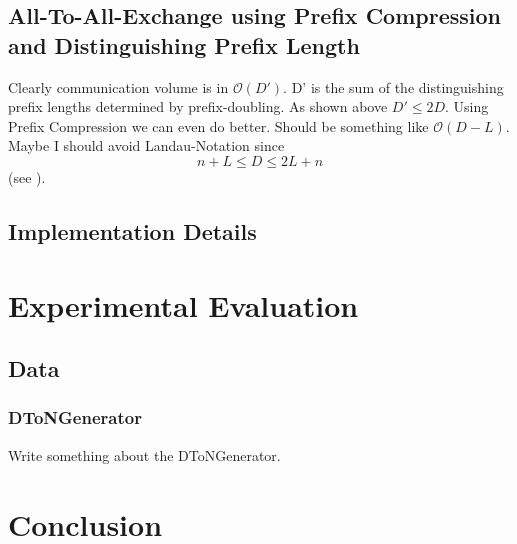\documentclass[12pt,a4paper,twoside]{scrartcl}
\numberwithin{equation}{section}
\begin{document}
\subsection{All-To-All-Exchange using Prefix Compression and Distinguishing Prefix Length}

Clearly communication volume is in $\mathcal{O}(D')$. D' is the sum of the distinguishing prefix lengths determined by prefix-doubling. As shown above $D' \le 2 D$. 
Using Prefix Compression we can even do better. Should be something like $\mathcal{O}(D - L)$. Maybe I should avoid Landau-Notation since 
\[
n + L \le D \le 2L + n
\] (see \cite{bingmann2018scalable}).

\subsection{Implementation Details}




	


\section{Experimental Evaluation}
\subsection{Data}
\subsubsection{DToNGenerator}
Write something about the DToNGenerator.


\section{Conclusion}







\clearpage




\end{document}

